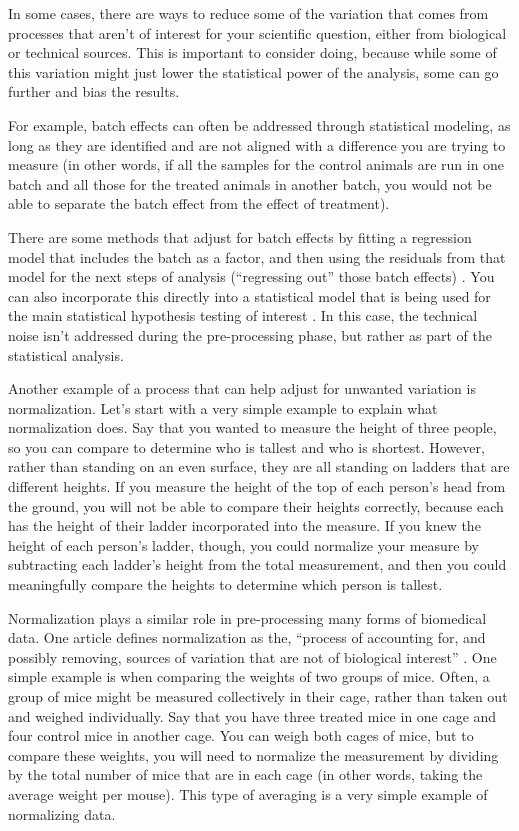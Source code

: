 \documentclass[]{tufte-book}
\begin{document}
In some cases, there are ways to reduce some of the variation that comes from
processes that aren't of interest for your scientific question, either from
biological or technical sources. This is important to consider doing, because
while some of this variation might just lower the statistical power of the
analysis, some can go further and bias the results.

For example, batch effects can often be addressed through statistical modeling,
as long as they are identified and are not aligned with a difference you
are trying to measure (in other words, if all the samples for the control
animals are run in one batch and all those for the treated animals in
another batch, you would not be able to separate the batch effect from
the effect of treatment).

There are some methods that adjust for batch effects by fitting a regression
model that includes the batch as a factor, and then using the residuals from
that model for the next steps of analysis (``regressing out'' those batch effects)
\citep{mccarthy2017scater}. You can also incorporate this directly into a statistical
model that is being used for the main statistical hypothesis testing of interest
\citep{mccarthy2017scater}. In this case, the technical noise isn't addressed
during the pre-processing phase, but rather as part of the statistical analysis.

Another example of a process that can help adjust for unwanted variation is
normalization. Let's start with a very simple example to explain what
normalization does. Say that you wanted to measure the height of three people,
so you can compare to determine who is tallest and who is shortest.
However, rather than standing on an even surface, they are all standing on
ladders that are different heights. If you measure the height of the top of
each person's head from the ground, you will not be able to compare their
heights correctly, because each has the height of their ladder incorporated
into the measure. If you knew the height of each person's ladder, though,
you could normalize your measure by subtracting each ladder's height from
the total measurement, and then you could meaningfully compare the heights
to determine which person is tallest.

Normalization plays a similar role in pre-processing many forms of biomedical
data. One article defines normalization as the, ``process of accounting for, and
possibly removing, sources of variation that are not of biological interest''
\citep{mak2011john}. One simple example is when comparing the weights of two groups
of mice. Often, a group of mice might be measured collectively in their cage,
rather than taken out and weighed individually. Say that you have three treated
mice in one cage and four control mice in another cage. You can weigh both cages
of mice, but to compare these weights, you will need to normalize the
measurement by dividing by the total number of mice that are in each cage (in
other words, taking the average weight per mouse). This type of averaging is a
very simple example of normalizing data.
\end{document}
